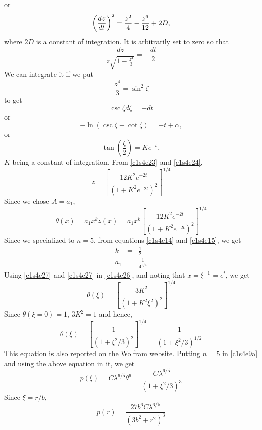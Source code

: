 \begin{itemize}
\[\]
or
\[
\left(\frac{d{z}}{d{t}}\right)^2 = \frac{z^2}{4} - \frac{z^6}{12} + 2D,
\]
where $2D$ is a constant of integration. It is arbitrarily set to zero so that
\[
\frac{dz}{z\sqrt{1 - \frac{z^4}{3}}} = -\frac{dt}{2}
\]
We can integrate it if we put 
\begin{equation}\label{c1s4e23}
\frac{z^4}{3} = \sin^2\zeta
\end{equation}
to get
\[
\csc\zeta d\zeta = -dt
\]
or
\[
-\ln(\csc\zeta + \cot\zeta) = -t + \alpha,
\]
or
\begin{equation}\label{c1s4e24}
\tan\left(\frac{\zeta}{2}\right) = Ke^{-t},
\end{equation}
$K$ being a constant of integration. From \eqref{c1s4e23} and \eqref{c1s4e24},
\begin{equation}\label{c1s4e25}
z = \left[\frac{12K^2e^{-2t}}{(1 + K^2e^{-2t})^2}\right]^{1/4}
\end{equation}
Since we chose $A = a_1$,
\begin{equation}\label{c1s4e26}
\theta(x) = a_1x^kz(x) = a_1x^k \left[\frac{12K^2e^{-2t}}{(1 + K^2e^{-2t})^2}\right]^{1/4}
\end{equation}
Since we specialized to $n=5$, from equations \eqref{c1s4e14} and \eqref{c1s4e15}, we get
\begin{eqnarray}
k &=& \frac{1}{2} \label{c1s4e27} \\
a_1 &=& \frac{1}{4^{1/4}} \label{c1s4e28}
\end{eqnarray}
Using \eqref{c1s4e27} and \eqref{c1s4e27} in \eqref{c1s4e26}, and noting that $x = \xi^{-1} = e^t$, we get
\begin{equation}\label{c1s4e29}
\theta(\xi) = \left[\frac{3K^2}{(1 + K^2\xi^2)^2}\right]^{1/4}
\end{equation}
Since $\theta(\xi = 0) = 1$, $3K^2 = 1$ and hence,
\begin{equation}\label{c1s4e30}
\theta(\xi) = \left[\frac{1}{(1 + \xi^2/3)^2}\right]^{1/4} = \frac{1}{(1 + \xi^2/3)^{1/2}}
\end{equation}
This equation is also reported on the \href{http://mathworld.wolfram.com/Lane-EmdenDifferentialEquation.html}{Wolfram} website.
Putting $n = 5$ in \eqref{c1s4e9a} and using the above equation in it, we get
\begin{equation}\label{c1s4e31}
p(\xi) = C\lambda^{6/5}\theta^6 = \frac{C\lambda^{6/5}}{(1 + \xi^2/3)^3}
\end{equation}
Since $\xi = r/b$,
\begin{equation}\label{c1s4e32}
p(r) = \frac{27b^6C\lambda^{6/5}}{(3b^2 + r^2)^3}

\end{equation}
\end{itemize}

